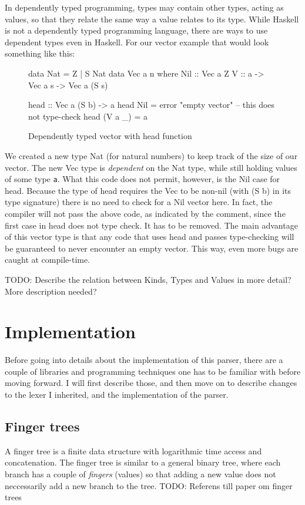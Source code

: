 \documentclass[a4paper,12pt,twosided]{report}
\begin{document}
In dependently typed programming, types may contain other types, acting as
values, so that they relate the same way a value relates to its type. While
Haskell is not a dependently typed programming language, there are ways to use
dependent types even in Haskell. For our vector example that would look
something like this:
\begin{figure}[H]
\begin{code}
data Nat = Z | S Nat
data Vec a n where
    Nil :: Vec a Z
    V :: a -> Vec a s -> Vec a (S s)

head :: Vec a (S b) -> a
head Nil = error "empty vector" -- this does not type-check
head (V a _) = a
\end{code}
\caption{Dependently typed vector with head function}
\end{figure}
We created a new type Nat (for natural numbers) to keep track of the size of our
vector. The new Vec type is \textit{dependent} on the Nat type, while still
holding values of some type \texttt{a}. What this code does not permit, however,
is the Nil case for head. Because the type of head requires the Vec to be
non-nil (with (S b) in its type signature) there is no need to check for a Nil
vector here. In fact, the compiler will not pass the above code, as indicated by
the comment, since the first case in head does not type check. It has to be
removed. The main advantage of this vector type is that any code that uses head
and passes type-checking will be guaranteed to never encounter an empty vector.
This way, even more bugs are caught at compile-time.

TODO: Describe the relation between Kinds, Types and Values in more detail? More description needed?

%
%

\chapter{Implementation}
Before going into details about the implementation of this parser, there are a
couple of libraries and programming techniques one has to be familiar with
before moving forward. I will first describe those, and then move on to describe
changes to the lexer I inherited, and the implementation of the parser.

\section{Finger trees}
A finger tree is a finite data structure with logarithmic time access and
concatenation. The finger tree is similar to a general binary tree, where each
branch has a couple of \textit{fingers} (values) so that adding a new value does
not neccessarily add a new branch to the tree. TODO: Referens till paper om finger trees
\end{document}
